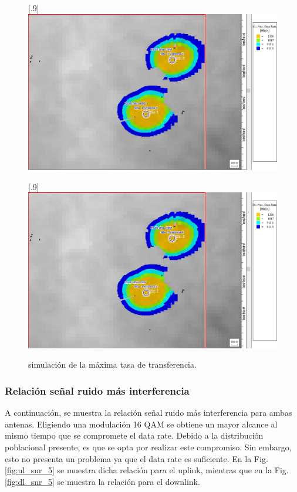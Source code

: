 \documentclass[11pt,a4paper]{article}
\begin{document}
\begin{figure}[ht!]
  \centering
  [.9\linewidth]{\includegraphics[height=14\baselineskip]{fotos_ema/ul_drate_5GHz.jpg}}

  [.9\linewidth]{\includegraphics[height=14\baselineskip]{fotos_ema/dl_drate_5GHz.jpg}}
  \caption{simulación de la máxima tasa de transferencia.}
  \label{fig:vel_trans_datos_5}
\end{figure}


\subsubsection{Relación señal ruido más interferencia}

A continuación, se muestra la relación señal ruido más interferencia para ambas antenas. 
Eligiendo una modulación 16 QAM se obtiene un mayor alcance al mismo tiempo que se  compromete el data rate. 
Debido a la distribución poblacional presente, es que se opta por realizar este compromiso. 
Sin embargo, esto no presenta un problema ya que el data rate es suficiente. 
En la Fig. \ref{fig:ul_snr_5} se muestra dicha relación para el uplink, mientras que en la Fig. \ref{fig:dl_snr_5} se muestra la relación para el downlink.
\end{document}
